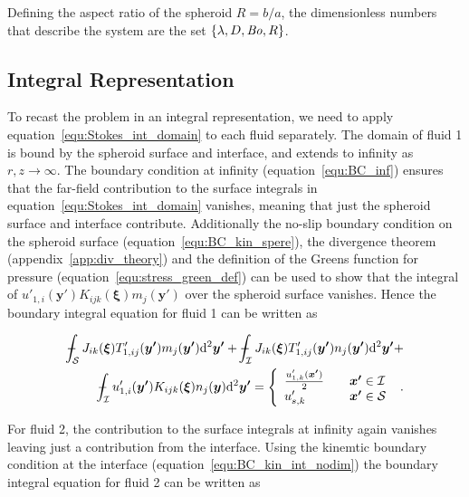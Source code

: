 \documentclass[12pt]{article}
\newcommand\Bo{\mbox{\textit{Bo}}}  %
\def\Xint#1{\mathchoice
{\XXint\displaystyle\textstyle{#1}}%
{\XXint\textstyle\scriptstyle{#1}}%
{\XXint\scriptstyle\scriptscriptstyle{#1}}%
{\XXint\scriptscriptstyle\scriptscriptstyle{#1}}%
\!\int}
\def\XXint#1#2#3{{\setbox0=\hbox{$#1{#2#3}{\int}$}
\vcenter{\hbox{$#2#3$}}\kern-.5\wd0}}
\def\dashint{\Xint-}
\begin{document}
Defining the aspect ratio of the spheroid $R = b / a$, the dimensionless numbers that describe the system are the set $\{\lambda, D, \Bo, R\}$.

\subsection{Integral Representation}
\label{subsec:prob_int_rep}

To recast the problem in an integral representation, we need to apply equation~\ref{equ:Stokes_int_domain} to each fluid separately. The domain of fluid 1 is bound by the spheroid surface and interface, and extends to infinity as $r, z \to \infty$. The boundary condition at infinity (equation~\ref{equ:BC_inf}) ensures that the far-field contribution to the surface integrals in equation~\ref{equ:Stokes_int_domain} vanishes, meaning that just the spheroid surface and interface contribute. Additionally the no-slip boundary condition on the spheroid surface (equation~\ref{equ:BC_kin_spere}), the divergence theorem (appendix~\ref{app:div_theory}) and the definition of the Greens function for pressure (equation~\ref{equ:stress_green_def}) can be used to show that the integral of $u'_{1,i}(\boldsymbol{y'}) K_{ijk}(\boldsymbol{\xi}) m_{j}(\boldsymbol{y'})$ over the spheroid surface vanishes. Hence the boundary integral equation for fluid 1 can be written as 


\begin{align}
\label{equ:bie_fluid1}
\dashint_{\mathcal{S}} J_{ik}(\boldsymbol{\xi}) T'_{1,ij}(\boldsymbol{y'}) m_{j}(\boldsymbol{y'}) \mathrm{d}^{2} \boldsymbol{y'} + \dashint_{\mathcal{I}} J_{ik}(\boldsymbol{\xi}) T'_{1,ij}(\boldsymbol{y'}) n_{j}(\boldsymbol{y'}) \mathrm{d}^{2}\boldsymbol{y'} + \nonumber \\
\dashint_{\mathcal{I}} u'_{1,i}(\boldsymbol{y'}) K_{ijk}(\boldsymbol{\xi}) n_{j}(\boldsymbol{y}) \mathrm{d}^{2}\boldsymbol{y'} = 
\left\{
    \begin{array}{l l}
      \frac{u'_{1,k}(\boldsymbol{x'})}{2} &\quad \boldsymbol{x'} \in \mathcal{I} \\
      u'_{s,k} &\quad \boldsymbol{x'} \in \mathcal{S} 
\end{array}
\right.\ .
\end{align}

For fluid 2, the contribution to the surface integrals at infinity again vanishes leaving just a contribution from the interface. Using the kinemtic boundary condition at the interface (equation~\ref{equ:BC_kin_int_nodim}) the boundary integral equation for fluid 2 can be written as
\end{document}
